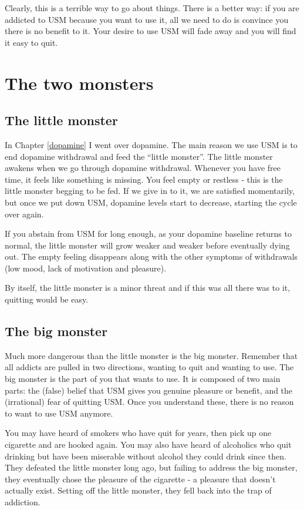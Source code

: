 \documentclass[
  openany]{book}
\begin{document}
Clearly, this is a terrible way to go about things. There is a better way: if you are addicted to USM because you want to use it, all we need to do is convince you there is no benefit to it. Your desire to use USM will fade away and you will find it easy to quit.

\chapter{The two monsters}\label{two-monsters}

\section{The little monster}\label{the-little-monster}

In Chapter \ref{dopamine} I went over dopamine. The main reason we use USM is to end dopamine withdrawal and feed the ``little monster''. The little monster awakens when we go through dopamine withdrawal. Whenever you have free time, it feels like something is missing. You feel empty or restless - this is the little monster begging to be fed. If we give in to it, we are satisfied momentarily, but once we put down USM, dopamine levels start to decrease, starting the cycle over again.

If you abstain from USM for long enough, as your dopamine baseline returns to normal, the little monster will grow weaker and weaker before eventually dying out. The empty feeling disappears along with the other symptoms of withdrawals (low mood, lack of motivation and pleasure).

By itself, the little monster is a minor threat and if this was all there was to it, quitting would be easy.

\section{The big monster}\label{the-big-monster}

Much more dangerous than the little monster is the big monster. Remember that all addicts are pulled in two directions, wanting to quit and wanting to use. The big monster is the part of you that wants to use. It is composed of two main parts: the (false) belief that USM gives you genuine pleasure or benefit, and the (irrational) fear of quitting USM. Once you understand these, there is no reason to want to use USM anymore.

You may have heard of smokers who have quit for years, then pick up one cigarette and are hooked again. You may also have heard of alcoholics who quit drinking but have been miserable without alcohol they could drink since then. They defeated the little monster long ago, but failing to address the big monster, they eventually chose the pleasure of the cigarette - a pleasure that doesn't actually exist. Setting off the little monster, they fell back into the trap of addiction.
\end{document}
